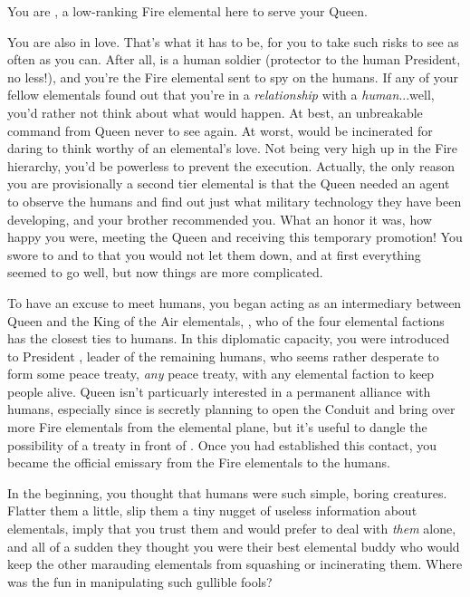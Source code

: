 \documentclass[char]{elementals}
\begin{document}
\name{\cJuliet{}}

You are \cJuliet{\intro}, a low-ranking Fire elemental here to serve your Queen.

You are also in love.  That's what it has to be, for you to take such risks to see \cRomeo{\intro} as often as you can.  After all, \cRomeo{\they} is a human soldier (protector to the human President, no less!), and you're the Fire elemental sent to spy on the humans.  If any of your fellow elementals found out that you're in a \emph{relationship} with a \emph{human}...well, you'd rather not think about what would happen.  At best, an unbreakable command from Queen \cQueen{\intro} never to see \cRomeo{} again.  At worst, \cRomeo{\they} would be incinerated for daring to think \cRomeo{\themself} worthy of an elemental's love.  Not being very high up in the Fire hierarchy, you'd be powerless to prevent the execution.  Actually, the only reason you are provisionally a second tier elemental is that the Queen needed an agent to observe the humans and find out just what military technology they have been developing, and your brother \cPyro{\intro} recommended you.  What an honor it was, how happy you were, meeting the Queen and receiving this temporary promotion!  You swore to \cQueen{\them} and to \cPyro{} that you would not let them down, and at first everything seemed to go well, but now things are more complicated.

To have an excuse to meet humans, you began acting as an intermediary between Queen \cQueen{} and the King of the Air elementals, \cKing{\intro}, who of the four elemental factions has the closest ties to humans.  In this diplomatic capacity, you were introduced to President \cLeader{\intro}, leader of the remaining humans, who seems rather desperate to form some peace treaty, \emph{any} peace treaty, with any elemental faction to keep \cLeader{\their} people alive.  Queen \cQueen{} isn't particuarly interested in a permanent alliance with humans, especially since \cQueen{\they} is secretly planning to open the Conduit and bring over more Fire elementals from the elemental plane, but it's useful to dangle the possibility of a treaty in front of \cLeader{}.  Once you had established this contact, you became the official emissary from the Fire elementals to the humans.

In the beginning, you thought that humans were such simple, boring creatures.  Flatter them a little, slip them a tiny nugget of useless information about elementals, imply that you trust them and would prefer to deal with \emph{them} alone, and all of a sudden they thought you were their best elemental buddy who would keep the other marauding elementals from squashing or incinerating them.  Where was the fun in manipulating such gullible fools?
\end{document}
